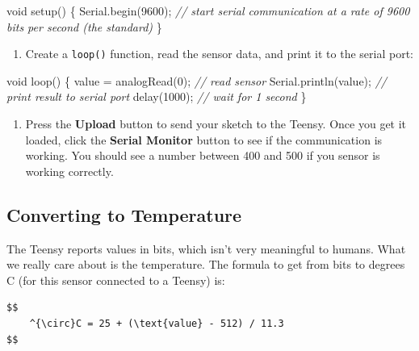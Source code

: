 \documentclass[]{book}
\newenvironment{Shaded}{\begin{snugshade}}{\end{snugshade}}
\newcommand{\CommentTok}[1]{\textcolor[rgb]{0.56,0.35,0.01}{\textit{#1}}}
\newcommand{\DataTypeTok}[1]{\textcolor[rgb]{0.13,0.29,0.53}{#1}}
\newcommand{\DecValTok}[1]{\textcolor[rgb]{0.00,0.00,0.81}{#1}}
\newcommand{\NormalTok}[1]{#1}
\providecommand{\tightlist}{%
  \setlength{\itemsep}{0pt}\setlength{\parskip}{0pt}}
\begin{document}
\begin{Shaded}
\begin{Highlighting}[]
    \DataTypeTok{void}\NormalTok{ setup() \{}
\NormalTok{        Serial.begin(}\DecValTok{9600}\NormalTok{);  }\CommentTok{// start serial communication at a rate of 9600 bits per second (the standard)}
\NormalTok{    \}}
\end{Highlighting}
\end{Shaded}

\begin{enumerate}
\def\labelenumi{\arabic{enumi}.}
\setcounter{enumi}{3}
\tightlist
\item
  Create a \texttt{loop()} function, read the sensor data, and print it to the serial port:
\end{enumerate}

\begin{Shaded}
\begin{Highlighting}[]
    \DataTypeTok{void}\NormalTok{ loop() \{}
\NormalTok{        value = analogRead(}\DecValTok{0}\NormalTok{); }\CommentTok{// read sensor}
\NormalTok{        Serial.println(value); }\CommentTok{// print result to serial port}
\NormalTok{        delay(}\DecValTok{1000}\NormalTok{);           }\CommentTok{// wait for 1 second}
\NormalTok{    \}}
\end{Highlighting}
\end{Shaded}

\begin{enumerate}
\def\labelenumi{\arabic{enumi}.}
\setcounter{enumi}{4}
\tightlist
\item
  Press the \textbf{Upload} button to send your sketch to the Teensy. Once you get it loaded, click the \textbf{Serial Monitor} button to see if the communication is working. You should see a number between 400 and 500 if you sensor is working correctly.
\end{enumerate}

\hypertarget{converting-to-temperature}{%
\subsection{Converting to Temperature}\label{converting-to-temperature}}

The Teensy reports values in bits, which isn't very meaningful to humans. What we really care about is the temperature. The formula to get from bits to degrees C (for this sensor connected to a Teensy) is:

\begin{verbatim}
$$
    ^{\circ}C = 25 + (\text{value} - 512) / 11.3
$$
\end{verbatim}
\end{document}
